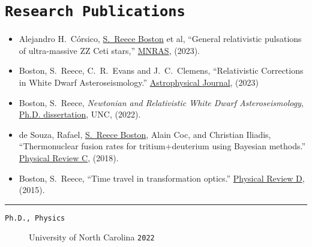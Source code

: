 \documentclass[11pt, letter]{article}
\begin{document}
\vspace{-0.5\baselineskip}

\vspace{-0.5\baselineskip}
\section*{\tt Research Publications \hfill \href{https://orcid.org/0000-0001-8122-1961}{}}
\begin{minipage}{\textwidth}
%
\begin{itemize}
		\item Alejandro H.~C\'orsico, \underline{S.~Reece Boston} et al, 
			``General relativistic pulsations of ultra-massive ZZ Ceti stars,'' 
			\href{https://doi.org/10.1093/mnras/stad2248}{MNRAS}, 
			(2023).
		\item Boston, S.~Reece, C.~R.~Evans and J.~C.~Clemens, 
			``Relativistic Corrections in White Dwarf Asteroseismology.'' 
			\href{https://iopscience.iop.org/article/10.3847/1538-4357/acd446}{Astrophysical Journal}, (2023)
		\item Boston, S.~Reece, 
			\emph{Newtonian and Relativistic White Dwarf Asteroseismology}, 
			\\\href{https://cdr.lib.unc.edu/concern/dissertations/jw827n44n?locale=en}{Ph.D. dissertation}, 
			UNC, (2022).
		\item de Souza, Rafael, \underline{S.~Reece Boston}, Alain Coc, and Christian Iliadis, 
			``Thermonuclear fusion rates for tritium+deuterium using Bayesian methods.''  
			\href{http://journals.aps.org/prc/abstract/10.1103/PhysRevC.99.014619}{Physical Review C}, 
			(2018).
		\item Boston, S.~Reece, 
			``Time travel in transformation optics.''  
			\href{http://journals.aps.org/prd/abstract/10.1103/PhysRevD.91.124035}{Physical Review D}, 
			(2015).
\end{itemize}
\hrule
\end{minipage}

\begin{description}
		\item[\tt Ph.D., Physics] University of North Carolina   \hfill {\tt 2022}
\end{description}
\vfill
\mbox{}
\end{document}
